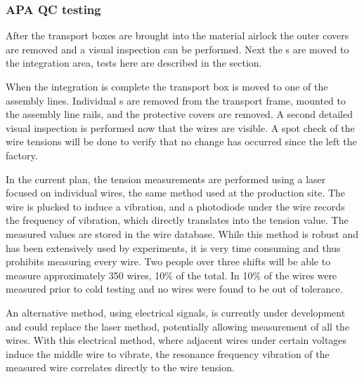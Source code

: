 \subsubsection{APA QC testing}

After the  transport boxes are brought into the material airlock the outer covers are removed and a visual inspection can be performed. Next the s are moved to the  integration area, tests here are described in the   section. 

When the  integration is complete the  transport box is moved to one of the  assembly lines. Individual s are removed from the transport frame, mounted to the assembly line rails, and the protective covers are removed. A second detailed visual inspection is performed now that the wires are visible. A spot check of the wire tensions will be done to verify that no change has occurred since the  left the factory.

 
In the current plan, the tension measurements are performed using a laser focused on individual wires, the same method used at the production site. 
The wire is plucked to induce a vibration, and a photodiode under the wire records the frequency of vibration, which directly translates into the tension value. 
The measured values are stored in the wire  database. 
While this method is robust and has been extensively used by  experiments, it is very time consuming and thus prohibits measuring every wire. 
Two people over three shifts will be able to measure approximately 350 wires, 10\% of the total. In  10\% of the wires were measured prior to cold testing and no wires were found to be out of tolerance.

An alternative method, using electrical signals, is currently under development and could replace the laser method, potentially allowing measurement of all the wires. 
With this electrical method, where adjacent wires under certain voltages induce the middle wire to vibrate, the resonance frequency vibration of the measured wire correlates directly
to the wire tension. 

